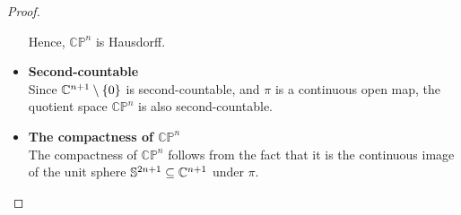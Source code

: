 \begin{problem}
\begin{proof}
\begin{itemize}
      Hence, $\mathbb{CP}^n$ is Hausdorff.
      \item \textbf{Second-countable}\\
      Since $\mathbb{C}^{n+1} \setminus \{0\}$ is second-countable, and $\pi$ is a continuous open map, the quotient space $\mathbb{CP}^n$ is also second-countable. 
      \item \textbf{The compactness of $\mathbb{CP}^n$}\\
      The compactness of $\mathbb{CP}^n$ follows from the fact that it is the continuous image of the unit sphere $\mathbb{S}^{2n+1} \subseteq \mathbb{C}^{n+1}$ under $\pi$. 
    \end{itemize}

  \end{proof}
\end{problem}

